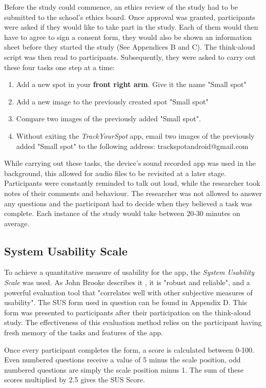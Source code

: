 Before the study could commence, an ethics review of the study had to be submitted to the school's ethics board. Once approval was granted, participants were asked if they would like to take part in the study. Each of them would then have to agree to sign a consent form, they would also be shown an information sheet before they started the study (See Appendices B and C).  The think-aloud script was then read to participants. Subsequently, they were asked to carry out these four tasks one step at a time:
\begin{enumerate}
    \item Add a new spot in your \textbf{front right arm}. Give it the name "Small spot"
    \item Add a new image to the previously created spot "Small spot"
    \item Compare two images of the previously added "Small spot".
    \item Without exiting the \emph{TrackYourSpot} app, email two images of the previously added "Small spot" to the following address: trackspotandroid@gmail.com
\end{enumerate}
While carrying out these tasks, the device's sound recorded app was used in the background, this allowed for audio files to be revisited at a later stage. Participants were constantly reminded to talk out loud, while the researcher took notes of their comments and behaviour. The researcher was not allowed to answer any questions and the participant had to decide when they believed a task was complete. Each instance of the study would take between 20-30 minutes on average.

\subsection{System Usability Scale}
To achieve a quantitative measure of usability for the app, the \emph{System Usability Scale} was used. As John Brooke describes it \cite{brooke1996sus}, it is "robust and reliable", and a powerful evaluation tool that "correlates well with other subjective measures of usability". The SUS form used in question can be found in Appendix D. This form was presented to participants after their participation on the think-aloud study. The effectiveness of this evaluation method relies on the participant having fresh memory of the tasks and features of the app.

Once every participant completes the form, a score is calculated between 0-100. Even numbered questions receive a value of 5 minus the scale position, odd numbered questions are simply the scale position minus 1. The sum of these scores multiplied by 2.5 gives the SUS Score.

